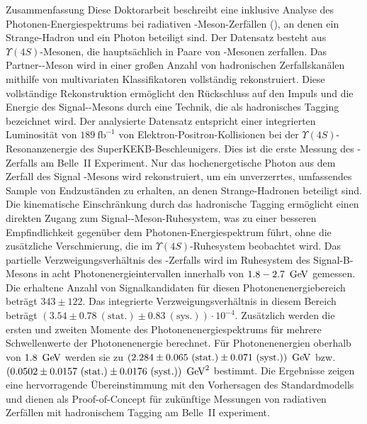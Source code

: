     \begin{abstractpage}{Zusammenfassung}
        \sloppy
        Diese Doktorarbeit beschreibt eine inklusive Analyse des Photonen-Energiespektrums bei radiativen \B-Meson-Zerfällen (\BtoXsgamma), an denen ein Strange-Hadron und ein Photon beteiligt sind.
        Der Datensatz besteht aus $\Upsilon(4S)$-Mesonen, die hauptsächlich in Paare von \B-Mesonen zerfallen.
        Das Partner-\B-Meson wird in einer großen Anzahl von hadronischen Zerfallskanälen mithilfe von multivariaten Klassifikatoren vollständig rekonstruiert. 
        Diese vollständige Rekonstruktion ermöglicht den Rückschluss auf den Impuls und die Energie des Signal-\B-Mesons durch eine Technik, die als hadronisches Tagging bezeichnet wird.
        Der analysierte Datensatz entspricht einer integrierten Luminosität von $189~\mathrm{fb}^{-1}$ von Elektron-Positron-Kollisionen bei der $\Upsilon(4S)$-Resonanzenergie des SuperKEKB-Beschleunigers. 
        Dies ist die erste Messung des \BtoXsgamma-Zerfalls am Belle~II Experiment.
        Nur das hochenergetische Photon aus dem Zerfall des Signal \B-Mesons wird rekonstruiert, um ein unverzerrtes, umfassendes Sample von Endzuständen zu erhalten, an denen Strange-Hadronen beteiligt sind. 
        Die kinematische Einschränkung durch das hadronische Tagging ermöglicht einen direkten Zugang zum Signal-\B-Meson-Ruhesystem, was zu einer besseren Empfindlichkeit gegenüber dem Photonen-Energiespektrum führt, ohne die zusätzliche Verschmierung, die im $\Upsilon(4S)$-Ruhesystem beobachtet wird.
        Das partielle Verzweigungsverh\"altnis des \BtoXsgamma-Zerfalls wird im Ruhesystem des Signal-B-Mesons in acht Photonenergieintervallen innerhalb von $1.8 - 2.7~\mathrm{\,Ge\kern -0.1em V}$ gemessen. 
        Die erhaltene Anzahl von Signalkandidaten für diesen Photonenenergiebereich beträgt $343 \pm 122$. 
        Das integrierte Verzweigungsverhältnis in diesem Bereich beträgt \mbox{$(3.54 \pm 0.78~(\mathrm{stat.}) \pm 0.83~(\mathrm{sys.}))\cdot10^{-4}$}.
        Zusätzlich werden die ersten und zweiten Momente des Photonenenergiespektrums für mehrere Schwellenwerte der Photonenenergie berechnet. 
        Für Photonenenergien oberhalb von $1.8~\mathrm{\,Ge\kern -0.1em V}$ werden sie zu \mbox{$(2.284 \pm 0.065~(\mathrm{stat.})\pm 0.071~(\mathrm{syst.}))~\mathrm{\,Ge\kern -0.1em V}$} bzw. \mbox{$(0.0502 \pm 0.0157~(\mathrm{stat.}) \pm 0.0176~(\mathrm{syst.}))~\mathrm{\,Ge\kern -0.1em V}^2$} bestimmt.
        Die Ergebnisse zeigen eine hervorragende Übereinstimmung mit den Vorhersagen des Standardmodells und dienen als Proof-of-Concept für zukünftige Messungen von radiativen \BtoXsgamma Zerfällen mit hadronischem Tagging am Belle~II experiment.
    \end{abstractpage}
    
